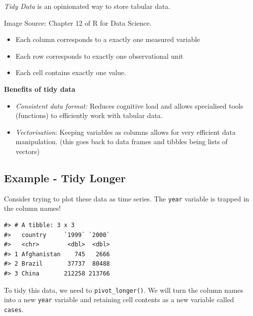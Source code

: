 \documentclass[
  letterpaper,
  DIV=11,
  numbers=noendperiod]{scrreprt}
\providecommand{\tightlist}{%
  \setlength{\itemsep}{0pt}\setlength{\parskip}{0pt}}\usepackage{longtable,booktabs,array}
\begin{document}
\emph{Tidy Data} is an opinionated way to store tabular data.

Image Source: Chapter 12 of R for Data Science.

\begin{itemize}
\tightlist
\item
  Each column corresponds to a exactly one measured variable
\item
  Each row corresponds to exactly one observational unit
\item
  Each cell contains exactly one value.
\end{itemize}

\textbf{Benefits of tidy data}

\begin{itemize}
\item
  \emph{Consistent data format:} Reduces cognitive load and allows
  specialised tools (functions) to efficiently work with tabular data.
\item
  \emph{Vectorisation}: Keeping variables as columns allows for very
  efficient data manipulation. (this goes back to data frames and
  tibbles being lists of vectors)
\end{itemize}

\subsection{Example - Tidy Longer}\label{example---tidy-longer}

Consider trying to plot these data as time series. The \texttt{year}
variable is trapped in the column names!

\begin{verbatim}
#> # A tibble: 3 x 3
#>   country     `1999` `2000`
#>   <chr>        <dbl>  <dbl>
#> 1 Afghanistan    745   2666
#> 2 Brazil       37737  80488
#> 3 China       212258 213766
\end{verbatim}

To tidy this data, we need to \texttt{pivot\_longer()}. We will turn the
column names into a new \texttt{year} variable and retaining cell
contents as a new variable called \texttt{cases}.
\end{document}
